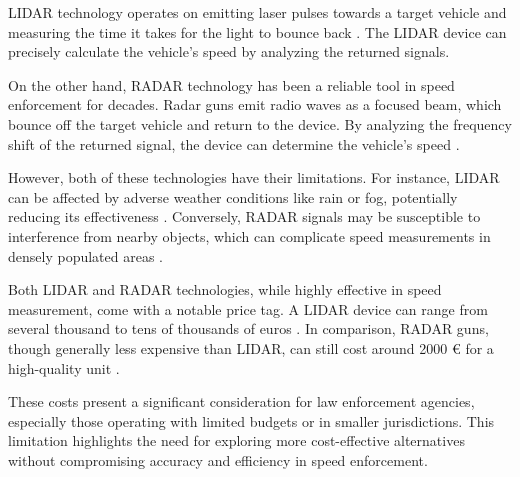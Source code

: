 LIDAR technology operates on emitting laser pulses towards a target vehicle and measuring the time it takes for the light to bounce back \cite{FlyGuys_2023}. The LIDAR device can precisely calculate the vehicle's speed by analyzing the returned signals.

On the other hand, RADAR technology has been a reliable tool in speed enforcement for decades. Radar guns emit radio waves as a focused beam, which bounce off the target vehicle and return to the device. By analyzing the frequency shift of the returned signal, the device can determine the vehicle's speed \cite{Policeradar}.

However, both of these technologies have their limitations. For instance, LIDAR can be affected by adverse weather conditions like rain or fog, potentially reducing its effectiveness \cite{dressig}. Conversely, RADAR signals may be susceptible to interference from nearby objects, which can complicate speed measurements in densely populated areas \cite{Hossain}.

Both LIDAR and RADAR technologies, while highly effective in speed measurement, come with a notable price tag. A LIDAR device can range from several thousand to tens of thousands of euros \cite{ProLaser4}. In comparison, RADAR guns, though generally less expensive than LIDAR, can still cost around 2000 € for a high-quality unit \cite{Danasafety}.

These costs present a significant consideration for law enforcement agencies, especially those operating with limited budgets or in smaller jurisdictions. This limitation highlights the need for exploring more cost-effective alternatives without compromising accuracy and efficiency in speed enforcement.

